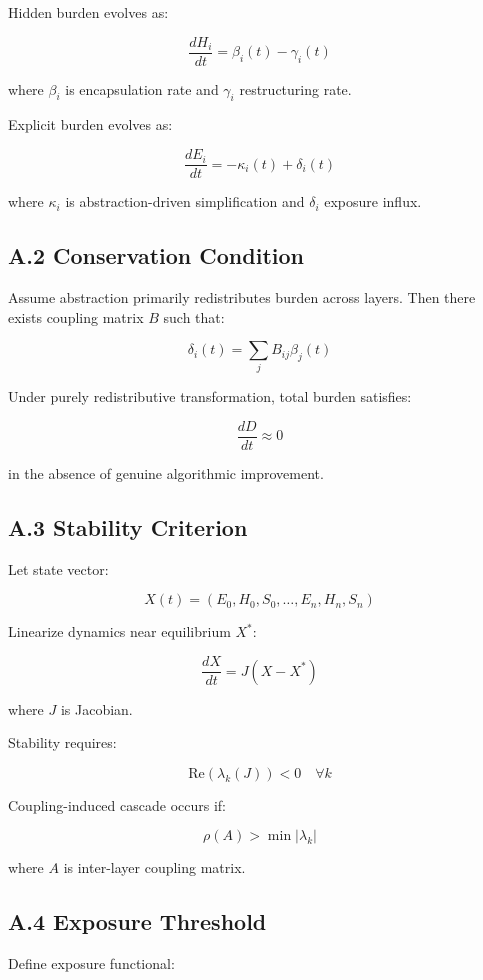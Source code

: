 \documentclass[11pt,openany]{book}
\begin{document}
Hidden burden evolves as:

\[
\frac{dH_i}{dt} = \beta_i(t) - \gamma_i(t)
\]

where $\beta_i$ is encapsulation rate and $\gamma_i$ restructuring rate.

Explicit burden evolves as:

\[
\frac{dE_i}{dt} = -\kappa_i(t) + \delta_i(t)
\]

where $\kappa_i$ is abstraction-driven simplification and $\delta_i$ exposure influx.

\subsection{A.2 Conservation Condition}

Assume abstraction primarily redistributes burden across layers.
Then there exists coupling matrix $B$ such that:

\[
\delta_i(t) = \sum_j B_{ij} \beta_j(t)
\]

Under purely redistributive transformation, total burden satisfies:

\[
\frac{dD}{dt} \approx 0
\]

in the absence of genuine algorithmic improvement.

\subsection{A.3 Stability Criterion}

Let state vector:

\[
X(t) = (E_0,H_0,S_0,\dots,E_n,H_n,S_n)
\]

Linearize dynamics near equilibrium $X^*$:

\[
\frac{dX}{dt} = J (X - X^*)
\]

where $J$ is Jacobian.

Stability requires:

\[
\text{Re}(\lambda_k(J)) < 0
\quad \forall k
\]

Coupling-induced cascade occurs if:

\[
\rho(A) > \min |\lambda_k|
\]

where $A$ is inter-layer coupling matrix.

\subsection{A.4 Exposure Threshold}

Define exposure functional:
\end{document}
